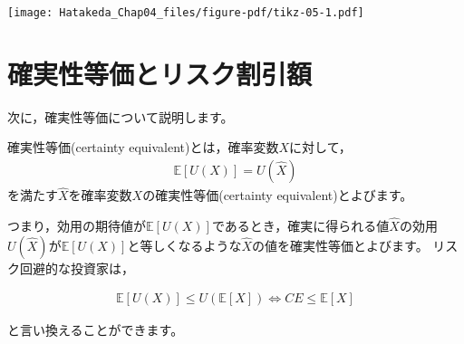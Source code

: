 \documentclass[
  letterpaper,
  pandoc,
  ja=standard,
  jafont = hiragino-pron]{ltjsbook}
\begin{document}
\texttt{[image: Hatakeda\_Chap04\_files/figure-pdf/tikz-05-1.pdf]}

\section{確実性等価とリスク割引額}\label{ux78baux5b9fux6027ux7b49ux4fa1ux3068ux30eaux30b9ux30afux5272ux5f15ux984d}

次に，確実性等価について説明します。

\begin{tcolorbox}[enhanced jigsaw, colframe=quarto-callout-important-color-frame, breakable, rightrule=.15mm, coltitle=black, title=\textcolor{quarto-callout-important-color}{\faExclamation}\hspace{0.5em}{確実性等価}, colbacktitle=quarto-callout-important-color!10!white, leftrule=.75mm, colback=white, left=2mm, arc=.35mm, opacityback=0, titlerule=0mm, toptitle=1mm, bottomtitle=1mm, bottomrule=.15mm, toprule=.15mm, opacitybacktitle=0.6]

確実性等価(certainty equivalent)とは，確率変数\(X\)に対して， \[
\begin{aligned}
\mathbb{E}[U(X)] = U ( \hat X)
\end{aligned}
\] を満たす\(\hat X\)を確率変数\(X\)の確実性等価(certainty
equivalent)とよびます。

\end{tcolorbox}

つまり，効用の期待値が\(\mathbb{E}[U(X)]\)であるとき，確実に得られる値\(\hat X\)の効用\(U ( \hat X)\)が\(\mathbb{E}[U(X)]\)と等しくなるような\(\hat X\)の値を確実性等価とよびます。
リスク回避的な投資家は，

\[
\begin{aligned}
\mathbb{E}[U(X)] \leq U(\mathbb{E}[X]) \Leftrightarrow CE \leq \mathbb{E}[X]
\end{aligned}
\]

と言い換えることができます。
\end{document}
